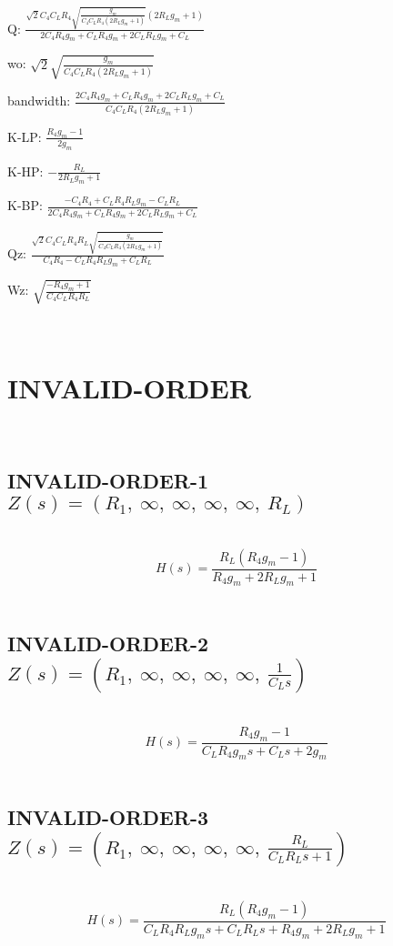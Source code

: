 \documentclass{article}
\begin{document}
Q: $\frac{\sqrt{2} C_{4} C_{L} R_{4} \sqrt{\frac{g_{m}}{C_{4} C_{L} R_{4} \left(2 R_{L} g_{m} + 1\right)}} \left(2 R_{L} g_{m} + 1\right)}{2 C_{4} R_{4} g_{m} + C_{L} R_{4} g_{m} + 2 C_{L} R_{L} g_{m} + C_{L}}$\ 

wo: $\sqrt{2} \sqrt{\frac{g_{m}}{C_{4} C_{L} R_{4} \left(2 R_{L} g_{m} + 1\right)}}$\ 

bandwidth: $\frac{2 C_{4} R_{4} g_{m} + C_{L} R_{4} g_{m} + 2 C_{L} R_{L} g_{m} + C_{L}}{C_{4} C_{L} R_{4} \left(2 R_{L} g_{m} + 1\right)}$\ 

K-LP: $\frac{R_{4} g_{m} - 1}{2 g_{m}}$\ 

K-HP: $- \frac{R_{L}}{2 R_{L} g_{m} + 1}$\ 

K-BP: $\frac{- C_{4} R_{4} + C_{L} R_{4} R_{L} g_{m} - C_{L} R_{L}}{2 C_{4} R_{4} g_{m} + C_{L} R_{4} g_{m} + 2 C_{L} R_{L} g_{m} + C_{L}}$\ 

Qz: $\frac{\sqrt{2} C_{4} C_{L} R_{4} R_{L} \sqrt{\frac{g_{m}}{C_{4} C_{L} R_{4} \left(2 R_{L} g_{m} + 1\right)}}}{C_{4} R_{4} - C_{L} R_{4} R_{L} g_{m} + C_{L} R_{L}}$\ 

Wz: $\sqrt{\frac{- R_{4} g_{m} + 1}{C_{4} C_{L} R_{4} R_{L}}}$\ 

\ 

\section{INVALID-ORDER}\ 
\subsection{INVALID-ORDER-1 $Z(s) = \left( R_{1}, \  \infty, \  \infty, \  \infty, \  \infty, \  R_{L}\right)$ } \ 
\textbf{\[H(s) = \frac{R_{L} \left(R_{4} g_{m} - 1\right)}{R_{4} g_{m} + 2 R_{L} g_{m} + 1}\] } \ 
\subsection{INVALID-ORDER-2 $Z(s) = \left( R_{1}, \  \infty, \  \infty, \  \infty, \  \infty, \  \frac{1}{C_{L} s}\right)$ } \ 
\textbf{\[H(s) = \frac{R_{4} g_{m} - 1}{C_{L} R_{4} g_{m} s + C_{L} s + 2 g_{m}}\] } \ 
\subsection{INVALID-ORDER-3 $Z(s) = \left( R_{1}, \  \infty, \  \infty, \  \infty, \  \infty, \  \frac{R_{L}}{C_{L} R_{L} s + 1}\right)$ } \ 
\textbf{\[H(s) = \frac{R_{L} \left(R_{4} g_{m} - 1\right)}{C_{L} R_{4} R_{L} g_{m} s + C_{L} R_{L} s + R_{4} g_{m} + 2 R_{L} g_{m} + 1}\] } \ 
\end{document}
